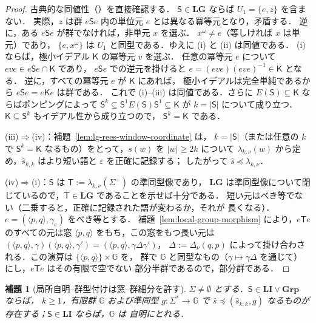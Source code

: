\documentclass[11pt,a4paper]{ltjsarticle}
\numberwithin{equation}{section}
\theoremstyle{plain}
\newtheorem{lemma}[theorem]{補題}
\theoremstyle{definition}
\theoremstyle{remark}
\newcommand{\eps}{\varepsilon}
\theoremstyle{plain}
\begin{document}
\begin{proof}
古典的な同値性（\cite[Proposition~2.3]{AlmeidaEtAl2009}）を直接確認する．
$\mathsf S\in\mathbf{LG}$ ならば $U_1=\{e,z\}$ を含まない．
実際，$z$ は群 $e\mathsf Se$ 内の単位元 $e$ とは異なる冪等元となり，矛盾する．
逆に，ある $e\mathsf Se$ が群でなければ，非単元 $x$ を選ぶ．
$x^\omega\ne e$（等しければ $x$ は単元）であり，
$\{e,x^\omega\}$ は $U_1$ と同型である．ゆえに (i) と (ii) は同値である．
(i) ならば，極小イデアル $\mathsf K$ の冪等元 $v$ を選ぶ．
任意の冪等元 $e$ について $eve\in e\mathsf Se\cap\mathsf K$ であり，
$e\mathsf Se$ での逆元を掛けると
$e=(eve)(eve)^{-1}\in\mathsf K$ となる．
逆に，すべての冪等元 $e$ が $\mathsf K$ にあれば，
極小イデアルは完全単純であるから $e\mathsf Se=e\mathsf Ke$ は群である．
これで (i)--(iii) は同値である．さらに
$E(\mathsf S)\subseteq\mathsf K$ ならばポンピングによって
$\mathsf S^k\subseteq\mathsf S^1E(\mathsf S)\mathsf S^1\subseteq\mathsf K$
が $k=|\mathsf S|$ について成り立つ．
$\mathsf K\subseteq\mathsf S^k$ もイデアル性から成り立つので，
$\mathsf S^k=\mathsf K$ である．

(iii)$\Rightarrow$(iv)：補題~\ref{lem:lg-rees-window-coordinate} は，
$k=|\mathsf S|$（または任意の $k$ で $\mathsf S^k=\mathsf K$ なるもの）をとって，$s(w)$ を $|w|\ge2k$ について
$\lambda_{k,\nu}(w)$ から定め，$\widehat s_{k,k}$ はより短い語と $\eps$ を正確に記録する；
したがって $\widehat s\preceq\lambda_{k,\nu}$．

(iv)$\Rightarrow$(i)：$\mathsf S$ は $\mathsf T:=\lambda_{k,\nu}(\Sigma^+)$ の準同型像であり，
$\mathbf{LG}$ は準同型像について閉じているので，$\mathsf T\in\mathbf{LG}$ であることを示せば十分である．
短い元はべき等でない（二乗すると，正確に記録された語が変わるか，それが
長くなる）．$e=(\langle p,q\rangle,\gamma_e)$ をべき等とする．
補題~\ref{lem:local-group-morphism} により，$e\mathsf Te$ のすべての元は窓
$\langle p,q\rangle$ をもち，この窓をもつ長い元は
$(\langle p,q\rangle,\gamma)(\langle p,q\rangle,\gamma')=(\langle p,q\rangle,\gamma\Delta\gamma')$，
$\Delta:=\Delta_\nu(q,p)$ によって掛け合わされる．この演算は $\{\langle p,q\rangle\}\times {\mathbb G}$ を，
群で ${\mathbb G}$ と同型なもの（$\gamma\mapsto\gamma\Delta$ を通じて）にし，$e\mathsf Te$ はその有限で空でない
部分半群であるので，部分群である．
\end{proof}

\begin{lemma}[局所自明--群型付けは窓--群細分を許す]
\label{lem:mcfg-li-group-window}
$\Sigma\ne\emptyset$ とする．$\mathsf S\in\mathbf{LI}\vee\mathbf{Grp}$ ならば，
$k\ge1$，有限群 ${\mathbb G}$ および準同型 $g:\Sigma^*\to {\mathbb G}$ で
$\widehat s\preceq(\widehat s_{k,k},g)$ なるものが存在する；$\mathsf S\in\mathbf{LI}$ ならば，${\mathbb G}$ は
自明にとれる．
\end{lemma}
\end{document}
